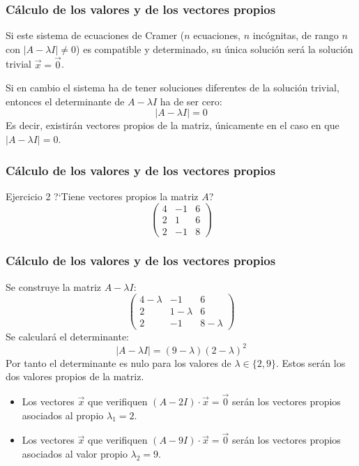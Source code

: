\documentclass{beamer}
\begin{document}
\begin{frame}
\frametitle{C\'alculo de los valores y de los vectores propios}
Si este sistema de ecuaciones de Cramer ($n$ ecuaciones, $n$ inc\'ognitas, de rango $n$ con $|A-\lambda I |\neq 0$) es compatible y determinado, su \'unica soluci\'on ser\'a la soluci\'on trivial $\vec x = \vec 0$.

Si en cambio el sistema ha de tener soluciones diferentes de la soluci\'on trivial, entonces el determinante de $A-\lambda I$ ha de ser cero:
\[|A-\lambda I| = 0\]
Es decir, existir\'an vectores propios de la matriz, \'unicamente en el caso en que $|A-\lambda I | = 0$.
\end{frame}

\begin{frame}
\frametitle{C\'alculo de los valores y de los vectores propios}
\begin{block}{Ejercicio 2}
?`Tiene vectores propios la matriz $A$?
\[\left(\begin{array}{rrr}4 & -1 & 6 \\2 & 1 & 6 \\2 & -1 & 8\end{array}\right)\]
\end{block}
\end{frame}

\begin{frame}
\frametitle{C\'alculo de los valores y de los vectores propios}
Se construye la matriz $A-\lambda I$:
\[\left(\begin{array}{ccc}4-\lambda & -1 & 6 \\2 & 1 -\lambda& 6 \\2 & -1 & 8-\lambda\end{array}\right)\]
Se calcular\'a el determinante:
\[|A-\lambda I | = (9-\lambda)(2-\lambda)^2\]
Por tanto el determinante es nulo para los valores de $\lambda \in \{2,9\}$. Estos ser\'an los dos valores propios de la matriz.
\begin{itemize}
\item Los vectores $\vec x$ que verifiquen $(A-2I)\cdot \vec x = \vec 0$ ser\'an los vectores propios asociados al propio $\lambda_1 = 2$.
\item Los vectores $\vec x$ que verifiquen $(A-9I)\cdot \vec x = \vec 0$ ser\'an los vectores propios asociados al valor propio $\lambda_2 = 9$.
\end{itemize}

\end{frame}
\end{document}
